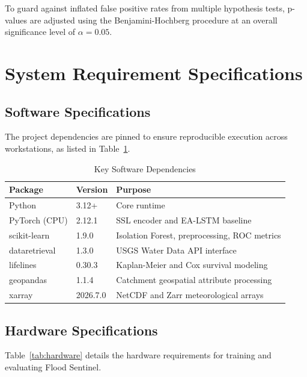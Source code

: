 \documentclass[12pt]{report}
\begin{document}
To guard against inflated false positive rates from multiple hypothesis tests, p-values are adjusted using the Benjamini-Hochberg procedure at an overall significance level of $\alpha = 0.05$.

\section{System Requirement Specifications}

\subsection{Software Specifications}

The project dependencies are pinned to ensure reproducible execution across workstations, as listed in Table~\ref{tab:software}.

\begin{table}[h]
  \caption{Key Software Dependencies}
  \label{tab:software}
  \centering
  \begin{tabular}{|l|l|l|}
    \hline
    \textbf{Package} & \textbf{Version} & \textbf{Purpose} \\
    \hline
    Python & 3.12+ & Core runtime \\
    \hline
    PyTorch (CPU) & 2.12.1 & SSL encoder and EA-LSTM baseline \\
    \hline
    scikit-learn & 1.9.0 & Isolation Forest, preprocessing, ROC metrics \\
    \hline
    dataretrieval & 1.3.0 & USGS Water Data API interface \\
    \hline
    lifelines & 0.30.3 & Kaplan-Meier and Cox survival modeling \\
    \hline
    geopandas & 1.1.4 & Catchment geospatial attribute processing \\
    \hline
    xarray & 2026.7.0 & NetCDF and Zarr meteorological arrays \\
    \hline
  \end{tabular}
\end{table}

\subsection{Hardware Specifications}

Table~\ref{tab:hardware} details the hardware requirements for training and evaluating Flood Sentinel.
\end{document}
